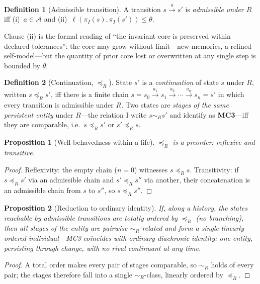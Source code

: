 \documentclass[11pt,a4paper]{article}
\newtheorem{proposition}{Proposition}
\theoremstyle{definition}
\newtheorem{definition}{Definition}
\begin{document}
\begin{definition}[Admissible transition]
A transition $s\xrightarrow{a}s'$ is \emph{admissible under $R$} iff (i)~$a\in\mathcal{A}$ and (ii)~$\ell\!\left(\pi_I(s),\pi_I(s')\right)\le\theta$.
\end{definition}

Clause (ii) is the formal reading of ``the invariant core is preserved within declared tolerances'': the core may grow without limit---new memories, a refined self-model---but the quantity of prior core lost or overwritten at any single step is bounded by $\theta$.

\begin{definition}[Continuation, $\preceq_R$]
State $s'$ is a \emph{continuation} of state $s$ under $R$, written $s\preceq_R s'$, iff there is a finite chain $s=s_0\xrightarrow{a_1}s_1\xrightarrow{a_2}\cdots\xrightarrow{a_n}s_n=s'$ in which every transition is admissible under $R$. Two states are \emph{stages of the same persistent entity} under $R$---the relation I write $s\sim_R s'$ and identify as \textbf{MC3}---iff they are comparable, i.e.\ $s\preceq_R s'$ or $s'\preceq_R s$.
\end{definition}

\begin{proposition}[Well-behavedness within a life]\label{prop:preorder}
$\preceq_R$ is a preorder: reflexive and transitive.
\end{proposition}
\begin{proof}
Reflexivity: the empty chain ($n=0$) witnesses $s\preceq_R s$. Transitivity: if $s\preceq_R s'$ via an admissible chain and $s'\preceq_R s''$ via another, their concatenation is an admissible chain from $s$ to $s''$, so $s\preceq_R s''$.
\end{proof}

\begin{proposition}[Reduction to ordinary identity]\label{prop:reduction}
If, along a history, the states reachable by admissible transitions are totally ordered by $\preceq_R$ (no branching), then all stages of the entity are pairwise $\sim_R$-related and form a single linearly ordered individual---MC3 coincides with ordinary diachronic identity: one entity, persisting through change, with no rival continuant at any time.
\end{proposition}
\begin{proof}
A total order makes every pair of stages comparable, so $\sim_R$ holds of every pair; the stages therefore fall into a single $\sim_R$-class, linearly ordered by $\preceq_R$.
\end{proof}
\end{document}
